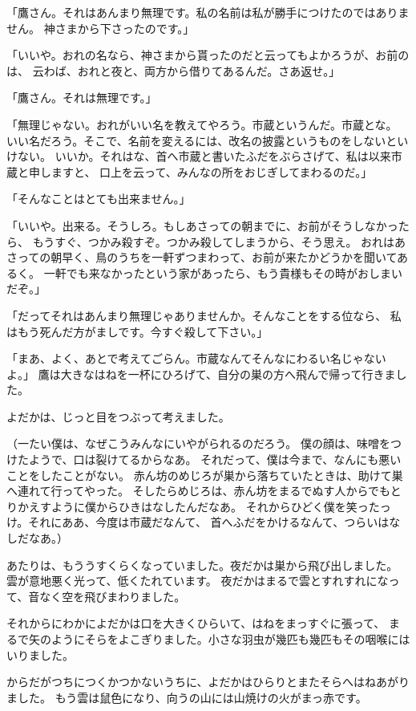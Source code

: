 \documentclass[a4paper, platex, dvipdfmx]{jsarticle}
\begin{document}
「鷹さん。それはあんまり無理です。私の名前は私が勝手につけたのではありません。
神さまから下さったのです。」

「いいや。おれの名なら、神さまから貰ったのだと云ってもよかろうが、お前のは、
云わば、おれと夜と、両方から借りてあるんだ。さあ返せ。」

「鷹さん。それは無理です。」

「無理じゃない。おれがいい名を教えてやろう。市蔵というんだ。市蔵とな。
いい名だろう。そこで、名前を変えるには、改名の披露というものをしないといけない。
いいか。それはな、首へ市蔵と書いたふだをぶらさげて、私は以来市蔵と申しますと、
口上を云って、みんなの所をおじぎしてまわるのだ。」

「そんなことはとても出来ません。」

「いいや。出来る。そうしろ。もしあさっての朝までに、お前がそうしなかったら、
もうすぐ、つかみ殺すぞ。つかみ殺してしまうから、そう思え。
おれはあさっての朝早く、鳥のうちを一軒ずつまわって、お前が来たかどうかを聞いてあるく。
一軒でも来なかったという家があったら、もう貴様もその時がおしまいだぞ。」

「だってそれはあんまり無理じゃありませんか。そんなことをする位なら、
私はもう死んだ方がましです。今すぐ殺して下さい。」

「まあ、よく、あとで考えてごらん。市蔵なんてそんなにわるい名じゃないよ。」
鷹は大きなはねを一杯にひろげて、自分の巣の方へ飛んで帰って行きました。

よだかは、じっと目をつぶって考えました。

（一たい僕は、なぜこうみんなにいやがられるのだろう。
僕の顔は、味噌をつけたようで、口は裂けてるからなあ。
それだって、僕は今まで、なんにも悪いことをしたことがない。
赤ん坊のめじろが巣から落ちていたときは、助けて巣へ連れて行ってやった。
そしたらめじろは、赤ん坊をまるでぬす人からでもとりかえすように僕からひきはなしたんだなあ。
それからひどく僕を笑ったっけ。それにああ、今度は市蔵だなんて、
首へふだをかけるなんて、つらいはなしだなあ。）

あたりは、もううすくらくなっていました。夜だかは巣から飛び出しました。
雲が意地悪く光って、低くたれています。
夜だかはまるで雲とすれすれになって、音なく空を飛びまわりました。

それからにわかによだかは口を大きくひらいて、はねをまっすぐに張って、
まるで矢のようにそらをよこぎりました。小さな羽虫が幾匹も幾匹もその咽喉にはいりました。

からだがつちにつくかつかないうちに、よだかはひらりとまたそらへはねあがりました。
もう雲は鼠色になり、向うの山には山焼けの火がまっ赤です。
\end{document}
